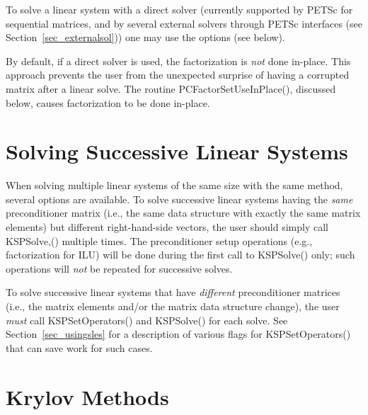 To solve a linear system with a direct solver (currently supported 
by PETSc for sequential matrices, and by several external solvers through
PETSc interfaces (see Section~\ref{sec_externalsol})) one may use the options
    
(see below).

By default, if a direct solver is used, the factorization is {\em not} done 
in-place. This approach prevents the user from the unexpected surprise
of having a corrupted matrix after a linear solve. The routine 
PCFactorSetUseInPlace(), discussed below, causes factorization to 
be done in-place. 

\section{Solving Successive Linear Systems}

When solving multiple linear systems of the same size with the same
method, several options are available.  To solve successive linear
systems having the {\em same} preconditioner matrix (i.e., the same
data structure with exactly the same matrix elements) but different
right-hand-side vectors, the user should simply call KSPSolve,()
multiple times.  The preconditioner setup operations (e.g.,
factorization for ILU) will be done during the first call to KSPSolve() only; such operations will {\em not} be repeated for
successive solves.

To solve successive linear systems that have {\em different}
preconditioner matrices (i.e., the matrix elements and/or the matrix
data structure change), the user {\em must} call 
KSPSetOperators() and KSPSolve() for each solve.  See
Section~\ref{sec_usingsles} for a description of various flags for
KSPSetOperators() that can save work for such cases.

\section{Krylov Methods}
\label{sec_ksp}

